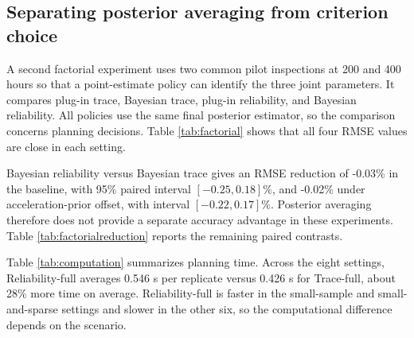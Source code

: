 \documentclass[a4paper,fleqn]{cas-sc}
\begin{document}
\begin{table}[t]
\centering
\caption{Prior-strength sensitivity. Prior SD denotes weak (0.4, 0.4, 0.25), current (0.8, 0.8, 0.5), and diffuse (1.6, 1.6, 1.0) standard deviations for $(\alpha,\beta,\log\sigma)$. Reduction compares Reliability-full with Reliability-1.}
\label{tab:prior}
\resizebox{\textwidth}{!}{}
\end{table}

\subsection{Separating posterior averaging from criterion choice}

A second factorial experiment uses two common pilot inspections at 200 and 400 hours so that a point-estimate policy can identify the three joint parameters. It compares plug-in trace, Bayesian trace, plug-in reliability, and Bayesian reliability. All policies use the same final posterior estimator, so the comparison concerns planning decisions. Table \ref{tab:factorial} shows that all four RMSE values are close in each setting.

\begin{table}[t]
\centering
\caption{Factorial comparison over 1000 matched replicates. Entries are RMSE (Monte Carlo standard error).}
\label{tab:factorial}
\resizebox{\textwidth}{!}{}
\end{table}

Bayesian reliability versus Bayesian trace gives an RMSE reduction of -0.03\% in the baseline, with 95\% paired interval $[-0.25,0.18]\%$, and -0.02\% under acceleration-prior offset, with interval $[-0.22,0.17]\%$. Posterior averaging therefore does not provide a separate accuracy advantage in these experiments. Table \ref{tab:factorialreduction} reports the remaining paired contrasts.

\begin{table}[t]
\centering
\caption{Paired RMSE reductions in the factorial experiments. Positive values favor the first policy.}
\label{tab:factorialreduction}
\resizebox{\textwidth}{!}{}
\end{table}

Table \ref{tab:computation} summarizes planning time. Across the eight settings, Reliability-full averages 0.546 s per replicate versus 0.426 s for Trace-full, about 28\% more time on average. Reliability-full is faster in the small-sample and small-and-sparse settings and slower in the other six, so the computational difference depends on the scenario.
\end{document}
